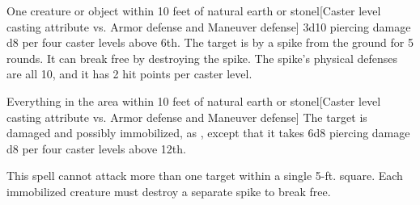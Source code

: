 \begin{spellheader}
    \spellrng{\rngmed}
\end{spellheader}
\begin{spelleffects}
    \begin{spelltarget}{One creature or object within 10 feet of natural earth or stone}l[Caster level \add casting attribute vs. Armor defense and Maneuver defense]
         3d10 piercing damage \add d8 per four caster levels above 6th.
         The target is \immobilized by a spike from the ground for 5 rounds. It can break free by destroying the spike. The spike's physical defenses are all 10, and it has 2 hit points per caster level.
    \end{spelltarget}
\end{spelleffects}
\begin{spellfooter}
    
\end{spellfooter}

\begin{spellheader}
    \spellrng{\rngmed}
\end{spellheader}
\begin{spelleffects}
    \begin{spelltargets}{Everything in the area within 10 feet of natural earth or stone}l[Caster level \add casting attribute vs. Armor defense and Maneuver defense]
        \spellsuccess The target is damaged and possibly immobilized, as , except that it takes 6d8 piercing damage \add d8 per four caster levels above 12th.
    \end{spelltargets}
\end{spelleffects}
\begin{spellfooter}
    \spellnotes This spell cannot attack more than one target within a single 5-ft. square. Each immobilized creature must destroy a separate spike to break free.
\end{spellfooter}

